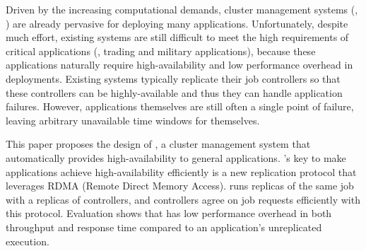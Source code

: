 
Driven by the increasing computational demands, cluster management systems 
(\eg, \mesos) are already pervasive for deploying many applications. 
Unfortunately, despite much effort, existing systems are still difficult to 
meet the high requirements of critical applications (\eg, trading and 
military applications), because these applications naturally require 
high-availability and low performance overhead in deployments. Existing systems 
typically replicate their job controllers so that these controllers can be 
highly-available and thus they can handle application failures. However, 
applications themselves are still often a single point of failure, leaving 
arbitrary unavailable time windows for themselves.


This paper proposes the design of \xxx, a cluster management system that 
automatically provides high-availability to general applications. \xxx's key to 
make applications achieve high-availability efficiently is a new \paxos 
replication protocol that leverages RDMA (Remote Direct Memory Access). \xxx 
runs replicas of the same job with a replicas of controllers, and 
controllers agree on job requests efficiently with this protocol.
Evaluation shows that \xxx has low performance overhead in 
both throughput and response time compared to an application's 
unreplicated execution.


